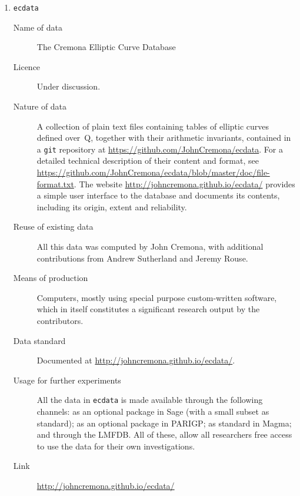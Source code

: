\documentclass{../../Proposal/LaTeX-proposal/deliverablereport}
\begin{document}
\begin{enumerate}
\item{{\tt ecdata}}
\begin{description}
\item[Name of data] The Cremona Elliptic Curve Database
\item[Licence]  Under discussion.
\item[Nature of data] A collection of plain text files containing tables of elliptic curves defined over~Q, together with their arithmetic invariants, contained in a {\tt git} repository at  \url{https://github.com/JohnCremona/ecdata}.  For a detailed technical description of their content and format, see  \url{https://github.com/JohnCremona/ecdata/blob/master/doc/file-format.txt}. The website  \url{http://johncremona.github.io/ecdata/} provides a simple user interface to the database and documents its contents, including its origin, extent and reliability.
\item[Reuse of existing data] All this data was computed by John Cremona, with additional contributions from Andrew Sutherland and Jeremy Rouse.
\item[Means of production] Computers, mostly using special purpose custom-written software, which in itself constitutes a significant research output by the contributors.
\item[Data standard] Documented at \url{http://johncremona.github.io/ecdata/}.
\item [Usage for further experiments] All the data in {\tt ecdata} is made available through the following channels: as an optional package in Sage (with a small subset as standard); as an optional package in PARIGP; as standard in Magma; and through the LMFDB.  All of these, allow all researchers free access to use the data for their own investigations.
\item [Link] \url{http://johncremona.github.io/ecdata/}
\end{description}


\end{enumerate}
\end{document}
